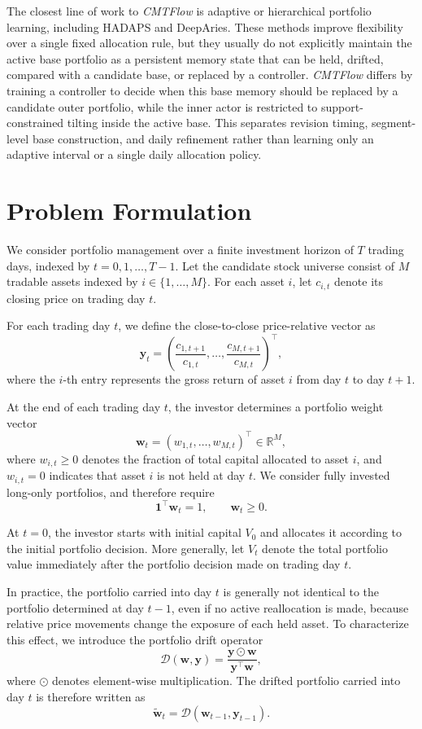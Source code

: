 \documentclass[letterpaper]{article} %
\begin{document}
The closest line of work to \textit{CMTFlow} is adaptive or hierarchical portfolio learning, including HADAPS and DeepAries. These methods improve flexibility over a single fixed allocation rule, but they usually do not explicitly maintain the active base portfolio as a persistent memory state that can be held, drifted, compared with a candidate base, or replaced by a controller. \textit{CMTFlow} differs by training a controller to decide when this base memory should be replaced by a candidate outer portfolio, while the inner actor is restricted to support-constrained tilting inside the active base. This separates revision timing, segment-level base construction, and daily refinement rather than learning only an adaptive interval or a single daily allocation policy.

\section{Problem Formulation}
We consider portfolio management over a finite investment horizon of $T$ trading days, indexed by $t=0,1,\dots,T-1$. Let the candidate stock universe consist of $M$ tradable assets indexed by $i\in\{1,\dots,M\}$. For each asset $i$, let $c_{i,t}$ denote its closing price on trading day $t$.

For each trading day $t$, we define the close-to-close price-relative vector as
\[
\mathbf{y}_t
=
\left(
\frac{c_{1,t+1}}{c_{1,t}},
\dots,
\frac{c_{M,t+1}}{c_{M,t}}
\right)^\top,
\]
where the $i$-th entry represents the gross return of asset $i$ from day $t$ to day $t+1$.

At the end of each trading day $t$, the investor determines a portfolio weight vector
\[
\mathbf{w}_t = (w_{1,t},\dots,w_{M,t})^\top \in \mathbb{R}^M,
\]
where $w_{i,t}\ge 0$ denotes the fraction of total capital allocated to asset $i$, and $w_{i,t}=0$ indicates that asset $i$ is not held at day $t$. We consider fully invested long-only portfolios, and therefore require
\[
\mathbf{1}^\top \mathbf{w}_t = 1,\qquad \mathbf{w}_t \ge 0.
\]

At $t=0$, the investor starts with initial capital $V_0$ and allocates it according to the initial portfolio decision. More generally, let $V_t$ denote the total portfolio value immediately after the portfolio decision made on trading day $t$.

In practice, the portfolio carried into day $t$ is generally not identical to the portfolio determined at day $t-1$, even if no active reallocation is made, because relative price movements change the exposure of each held asset. To characterize this effect, we introduce the portfolio drift operator
\[
\mathcal{D}(\mathbf{w},\mathbf{y})
=
\frac{\mathbf{y}\odot \mathbf{w}}{\mathbf{y}^\top \mathbf{w}},
\]
where $\odot$ denotes element-wise multiplication. The drifted portfolio carried into day $t$ is therefore written as
\[
\tilde{\mathbf{w}}_t
=
\mathcal{D}(\mathbf{w}_{t-1},\mathbf{y}_{t-1}).
\]
\end{document}
